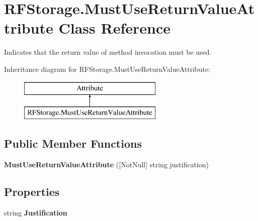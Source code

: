 \hypertarget{class_r_f_storage_1_1_must_use_return_value_attribute}{}\section{R\+F\+Storage.\+Must\+Use\+Return\+Value\+Attribute Class Reference}
\label{class_r_f_storage_1_1_must_use_return_value_attribute}


Indicates that the return value of method invocation must be used.  


Inheritance diagram for R\+F\+Storage.\+Must\+Use\+Return\+Value\+Attribute\+:\begin{figure}[H]
\begin{center}
\leavevmode
\includegraphics[height=2.000000cm]{class_r_f_storage_1_1_must_use_return_value_attribute}
\end{center}
\end{figure}
\subsection*{Public Member Functions}
\begin{DoxyCompactItemize}
\item 
\mbox{\label{class_r_f_storage_1_1_must_use_return_value_attribute_a9029626f9a494e853836049857d88175}} 
{\bfseries Must\+Use\+Return\+Value\+Attribute} (\mbox{[}Not\+Null\mbox{]} string justification)
\end{DoxyCompactItemize}
\subsection*{Properties}
\begin{DoxyCompactItemize}
\item 
\mbox{\label{class_r_f_storage_1_1_must_use_return_value_attribute_a6694d56cf5a8d15a8f40001812a09700}} 
string {\bfseries Justification}
\end{DoxyCompactItemize}


